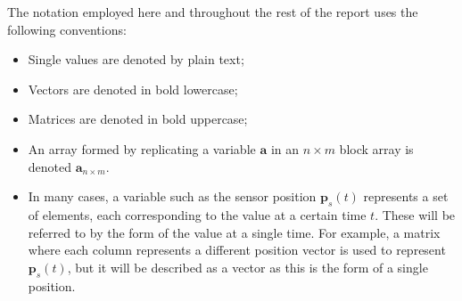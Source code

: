 The notation employed here and throughout the rest of the report uses the following conventions:
\begin{itemize} \setlength\itemsep{-2mm}
\item Single values are denoted by plain text;
\item Vectors are denoted in bold lowercase;
\item Matrices are denoted in bold uppercase;
\item An array formed by replicating a variable $\mathbf{a}$ in an $n \times m$ block array is denoted $\mathbf{a}_{n \times m}$.
\item In many cases, a variable such as the sensor position $\mathbf{p}_s(t)$ represents a set of elements, each corresponding to the value at a certain time $t$. These will be referred to by the form of the value at a single time. For example, a matrix where each column represents a different position vector is used to represent $\mathbf{p}_s(t)$, but it will be described as a vector as this is the form of a single position.
\end{itemize}

